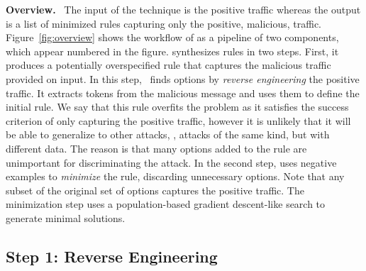 \documentclass[runningheads]{llncs}
\begin{document}
\vspace{1ex}
\noindent\textbf{Overview.}~ The input of the technique is the
positive traffic whereas the output is a list of minimized rules
capturing only the positive, malicious,
traffic. Figure~\ref{fig:overview} shows the workflow of \tname{} as a
pipeline of two components, which appear numbered in the figure.
\tname{} synthesizes rules in two steps. First, it produces a
potentially overspecified rule that captures the malicious traffic
provided on input. In this step, \tname\ finds options by
\emph{reverse engineering} the positive traffic. It extracts tokens
from the malicious message and uses them to define the initial
rule. We say that this rule overfits the problem as it satisfies the
success criterion of only capturing the positive traffic, however it
is unlikely that it will be able to generalize to other attacks,
\ie{}, attacks of the same kind, but with different data. The reason
is that many options added to the rule are unimportant for
discriminating the attack. In the second step, \tname{} uses negative
examples to \emph{minimize} the rule, discarding unnecessary
options. Note that any subset of the original set of options captures
the positive traffic. The minimization step uses a population-based
gradient descent-like search to generate minimal solutions.








\subsection{Step 1: Reverse Engineering}
\pgfplotsset{width=6cm,compat=1.8}
\end{document}
